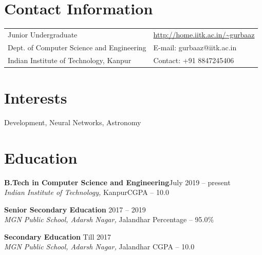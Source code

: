 \documentclass[margin,line]{res}
\begin{document}

\begin{resume}
\section{\sc \large Contact Information}

\vspace{.05in}
\begin{tabular}{@{}p{3.5in}p{3in}}
Junior Undergraduate            & \url{http://home.iitk.ac.in/~gurbaaz}\\
Dept. of Computer Science and Engineering
 & {E-mail:}  gurbaaz@iitk.ac.in\\
Indian Institute of Technology, Kanpur & {Contact:} +91 8847245406\\ 
\end{tabular}


\section{\sc \large  Interests}

Development, Neural Networks, Astronomy

\section{\sc \large Education}
{\bf B.Tech in Computer Science and Engineering}\hfill July 2019 -- present\\
{\it   Indian Institute of Technology,} Kanpur\hfill CGPA -- 10.0

{\bf Senior Secondary Education} \hfill 2017 -- 2019\\
{\it   MGN Public School, Adarsh Nagar,} Jalandhar \hfill Percentage -- 95.0\%

{\bf Secondary Education} \hfill Till 2017\\
{\it    MGN Public School, Adarsh Nagar,} Jalandhar \hfill CGPA -- 10.0


\end{resume}
\end{document}
